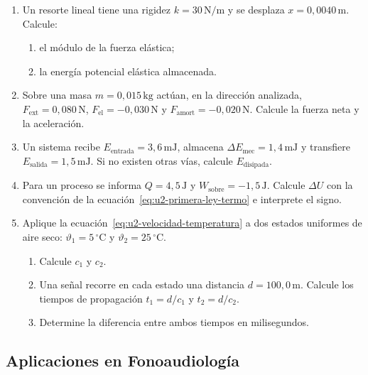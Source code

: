 \begin{enumerate}[label=\textbf{NA\arabic*.},leftmargin=*]
    \item Un resorte lineal tiene una rigidez
    \(k=30\,\text{N}/\text{m}\) y se desplaza
    \(x=0{,}0040\,\text{m}\). Calcule:
    \begin{enumerate}[label=\alph*)]
        \item el módulo de la fuerza elástica;
        \item la energía potencial elástica almacenada.
    \end{enumerate}

    \item Sobre una masa \(m=0{,}015\,\text{kg}\) actúan, en la dirección
    analizada, \(F_\mathrm{ext}=0{,}080\,\text{N}\),
    \(F_\mathrm{el}=-0{,}030\,\text{N}\) y
    \(F_\mathrm{amort}=-0{,}020\,\text{N}\). Calcule la fuerza neta y la
    aceleración.

    \item Un sistema recibe \(E_\mathrm{entrada}=3{,}6\,\text{mJ}\), almacena
    \(\Delta E_\mathrm{mec}=1{,}4\,\text{mJ}\) y transfiere
    \(E_\mathrm{salida}=1{,}5\,\text{mJ}\). Si no existen otras vías, calcule
    \(E_\mathrm{disipada}\).

    \item Para un proceso se informa
    \(Q=4{,}5\,\text{J}\) y
    \(W_\mathrm{sobre}=-1{,}5\,\text{J}\). Calcule \(\Delta U\) con la
    convención de la ecuación~\eqref{eq:u2-primera-ley-termo} e interprete el
    signo.

    \item Aplique la ecuación~\eqref{eq:u2-velocidad-temperatura} a dos estados
    uniformes de aire seco:
    \(\vartheta_1=5\,^{\circ}\text{C}\) y
    \(\vartheta_2=25\,^{\circ}\text{C}\).
    \begin{enumerate}[label=\alph*)]
        \item Calcule \(c_1\) y \(c_2\).
        \item Una señal recorre en cada estado una distancia
        \(d=100{,}0\,\text{m}\). Calcule los tiempos de propagación
        \(t_1=d/c_1\) y \(t_2=d/c_2\).
        \item Determine la diferencia entre ambos tiempos en milisegundos.
    \end{enumerate}
\end{enumerate}

\subsection*{Aplicaciones en Fonoaudiología}

